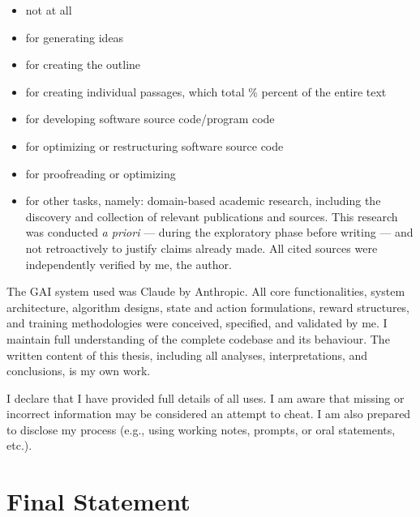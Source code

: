 \begin{itemize}[label=$\square$, leftmargin=2em, itemsep=0.2em]
  \item not at all
  \item for generating ideas
  \item for creating the outline
  \item for creating individual passages, which total \quad\% percent of the entire text
\end{itemize}
\begin{itemize}[label=$\boxtimes$, leftmargin=2em, itemsep=0.2em]
  \item for developing software source code/program code
  \item for optimizing or restructuring software source code
\end{itemize}
\begin{itemize}[label=$\square$, leftmargin=2em, itemsep=0.2em]
  \item for proofreading or optimizing
\end{itemize}
\begin{itemize}[label=$\boxtimes$, leftmargin=2em, itemsep=0.2em]
  \item for other tasks, namely: domain-based academic research, including the
    discovery and collection of relevant publications and sources. This research
    was conducted \emph{a priori} --- during the exploratory phase before
    writing --- and not retroactively to justify claims already made. All cited
    sources were independently verified by me, the author.
\end{itemize}

\bigskip
\noindent The GAI system used was Claude by Anthropic. All core functionalities,
system architecture, algorithm designs, state and action formulations, reward
structures, and training methodologies were conceived, specified, and validated
by me. I maintain full understanding of the complete codebase
and its behaviour. The written content of this thesis, including all analyses,
interpretations, and conclusions, is my own work.

\bigskip
\noindent I declare that I have provided full details of all uses. I am aware
that missing or incorrect information may be considered an attempt to cheat. I
am also prepared to disclose my process (e.g., using working notes, prompts, or
oral statements, etc.).


\section*{Final Statement}

